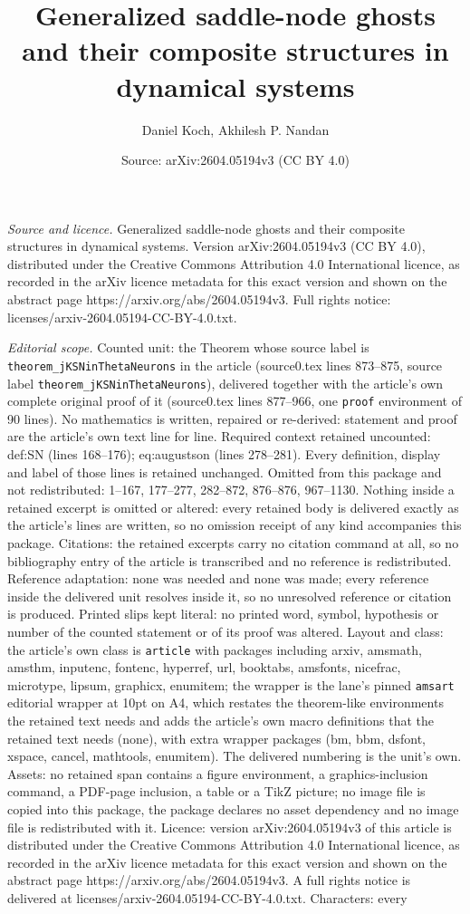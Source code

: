 \documentclass[10pt,a4paper]{amsart}
\title[Generalized saddle-node ghosts and their composite structure]{Generalized saddle-node ghosts and their composite structures in dynamical systems}
\author{Daniel Koch, Akhilesh P. Nandan}
\date{Source: arXiv:2604.05194v3 (CC BY 4.0)}
\begin{document}
\maketitle

\noindent\emph{Source and licence.} Generalized saddle-node ghosts and their composite structures in dynamical systems. Version arXiv:2604.05194v3 (CC BY 4.0), distributed under the Creative Commons Attribution 4.0 International licence, as recorded in the arXiv licence metadata for this exact version and shown on the abstract page https://arxiv.org/abs/2604.05194v3. Full rights notice: licenses/arxiv-2604.05194-CC-BY-4.0.txt.\par\smallskip

\noindent\textit{Editorial scope.} Counted unit: the Theorem whose source label is \texttt{theorem\_jKSNinThetaNeurons} in the article (source0.tex lines 873--875, source label \texttt{theorem\_jKSNinThetaNeurons}), delivered together with the article's own complete original proof of it (source0.tex lines 877--966, one \texttt{proof} environment of 90 lines). No mathematics is written, repaired or re-derived: statement and proof are the article's own text line for line. Required context retained uncounted: def:SN (lines 168--176); eq:augustson (lines 278--281). Every definition, display and label of those lines is retained unchanged. Omitted from this package and not redistributed: 1--167, 177--277, 282--872, 876--876, 967--1130. Nothing inside a retained excerpt is omitted or altered: every retained body is delivered exactly as the article's lines are written, so no omission receipt of any kind accompanies this package. Citations: the retained excerpts carry no citation command at all, so no bibliography entry of the article is transcribed and no reference is redistributed. Reference adaptation: none was needed and none was made; every reference inside the delivered unit resolves inside it, so no unresolved reference or citation is produced. Printed slips kept literal: no printed word, symbol, hypothesis or number of the counted statement or of its proof was altered. Layout and class: the article's own class is \texttt{article} with packages including arxiv, amsmath, amsthm, inputenc, fontenc, hyperref, url, booktabs, amsfonts, nicefrac, microtype, lipsum, graphicx, enumitem; the wrapper is the lane's pinned \texttt{amsart} editorial wrapper at 10pt on A4, which restates the theorem-like environments the retained text needs and adds the article's own macro definitions that the retained text needs (none), with extra wrapper packages (bm, bbm, dsfont, xspace, cancel, mathtools, enumitem). The delivered numbering is the unit's own. Assets: no retained span contains a figure environment, a graphics-inclusion command, a PDF-page inclusion, a table or a TikZ picture; no image file is copied into this package, the package declares no asset dependency and no image file is redistributed with it. Licence: version arXiv:2604.05194v3 of this article is distributed under the Creative Commons Attribution 4.0 International licence, as recorded in the arXiv licence metadata for this exact version and shown on the abstract page https://arxiv.org/abs/2604.05194v3. A full rights notice is delivered at licenses/arxiv-2604.05194-CC-BY-4.0.txt. Characters: every 
\end{document}
